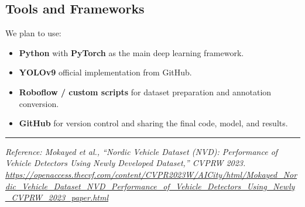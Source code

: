 \subsection{Tools and Frameworks}
 
We plan to use:
\begin{itemize}
    \item \textbf{Python} with \textbf{PyTorch} as the main deep learning framework.
    \item \textbf{YOLOv9} official implementation from GitHub.
    \item \textbf{Roboflow / custom scripts} for dataset preparation and annotation conversion.
    \item \textbf{GitHub} for version control and sharing the final code, model, and results.
\end{itemize}
 
\vspace{2em}
\hrule
\vspace{0.5em}
\footnotesize
\textit{Reference: Mokayed et al., ``Nordic Vehicle Dataset (NVD): Performance of Vehicle Detectors
Using Newly Developed Dataset,'' CVPRW 2023.
\url{https://openaccess.thecvf.com/content/CVPR2023W/AICity/html/Mokayed_Nordic_Vehicle_Dataset_NVD_Performance_of_Vehicle_Detectors_Using_Newly_CVPRW_2023_paper.html}}
 
